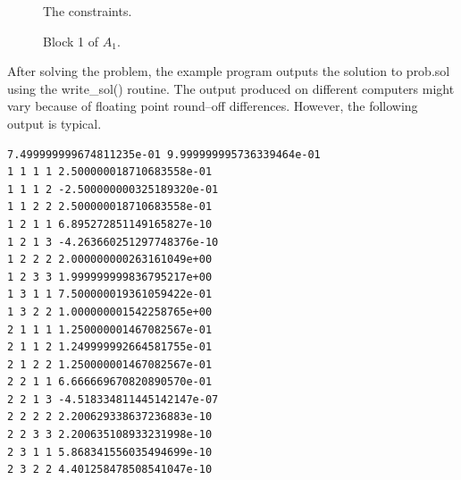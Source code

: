 \documentclass{article}
\begin{document}
\begin{figure}
\begin{center}
\caption{The constraints.}
\label{constraints}
\end{center}
\end{figure}

\begin{figure}
\begin{center}
\caption{Block 1 of $A_{1}$.}
\label{a1block1}
\end{center}
\end{figure}

\clearpage

After solving the problem, the example program outputs the solution to 
prob.sol using the write\_sol() routine.  The output produced on 
different computers might vary because of floating point round--off
differences.  However, the following output is typical.

\begin{verbatim}
7.499999999674811235e-01 9.999999995736339464e-01 
1 1 1 1 2.500000018710683558e-01 
1 1 1 2 -2.500000000325189320e-01 
1 1 2 2 2.500000018710683558e-01 
1 2 1 1 6.895272851149165827e-10 
1 2 1 3 -4.263660251297748376e-10 
1 2 2 2 2.000000000263161049e+00 
1 2 3 3 1.999999999836795217e+00 
1 3 1 1 7.500000019361059422e-01 
1 3 2 2 1.000000001542258765e+00 
2 1 1 1 1.250000001467082567e-01 
2 1 1 2 1.249999992664581755e-01 
2 1 2 2 1.250000001467082567e-01 
2 2 1 1 6.666669670820890570e-01 
2 2 1 3 -4.518334811445142147e-07 
2 2 2 2 2.200629338637236883e-10 
2 2 3 3 2.200635108933231998e-10 
2 3 1 1 5.868341556035494699e-10 
2 3 2 2 4.401258478508541047e-10 
\end{verbatim}
\end{document}
